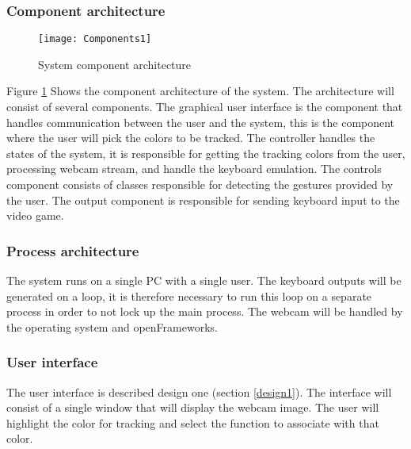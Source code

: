 \subsubsection{Component architecture}

\begin{figure}[!htb]
\centering
\texttt{[image: Components1]}
\caption{System component architecture}
\label{fig:components}
\end{figure}

Figure \ref{fig:components} Shows the component architecture of the system.
The architecture will consist of several components. The graphical user interface is the component that handles communication between the user and the system, this is the component where the user will pick the colors to be tracked. The controller handles the states of the system, it is responsible for getting the tracking colors from the user, processing webcam stream, and handle the keyboard emulation. The controls component consists of classes responsible for detecting the gestures provided by the user. The output component is responsible for sending keyboard input to the video game.

\subsubsection*{Process architecture}
The system runs on a single PC with a single user. The keyboard outputs will be generated on a loop, it is therefore necessary to run this loop on a separate process in order to not lock up the main process. The webcam will be handled by the operating system and openFrameworks.

\subsubsection{User interface}
The user interface is described design one (section \ref{design1}). The interface will consist of a single window that will display the webcam image. The user will highlight the color for tracking and select the function to associate with that color.